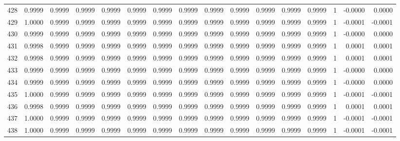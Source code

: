 \begin{tabular}{lrrrrrrrrrrrrrrr}
428 &      0.9999 &  0.9999 &  0.9999 &  0.9999 &  0.9999 &  0.9999 &  0.9999 &  0.9999 &  0.9999 &  0.9999 &   0.9999 &     0.9999 &      1 &                   -0.0000 &                     0.0000 \\
429 &      1.0000 &  0.9999 &  0.9999 &  0.9999 &  0.9999 &  0.9999 &  0.9999 &  0.9999 &  0.9999 &  0.9999 &   0.9999 &     0.9999 &      1 &                   -0.0001 &                    -0.0001 \\
430 &      0.9999 &  0.9999 &  0.9999 &  0.9999 &  0.9999 &  0.9999 &  0.9999 &  0.9999 &  0.9999 &  0.9999 &   0.9999 &     0.9999 &      1 &                   -0.0000 &                     0.0000 \\
431 &      0.9998 &  0.9999 &  0.9999 &  0.9999 &  0.9999 &  0.9999 &  0.9999 &  0.9999 &  0.9999 &  0.9999 &   0.9999 &     0.9999 &      1 &                    0.0001 &                     0.0001 \\
432 &      0.9998 &  0.9999 &  0.9999 &  0.9999 &  0.9999 &  0.9999 &  0.9999 &  0.9999 &  0.9999 &  0.9999 &   0.9999 &     0.9999 &      1 &                    0.0001 &                     0.0001 \\
433 &      0.9999 &  0.9999 &  0.9999 &  0.9999 &  0.9999 &  0.9999 &  0.9999 &  0.9999 &  0.9999 &  0.9999 &   0.9999 &     0.9999 &      1 &                   -0.0000 &                     0.0000 \\
434 &      0.9999 &  0.9999 &  0.9999 &  0.9999 &  0.9999 &  0.9999 &  0.9999 &  0.9999 &  0.9999 &  0.9999 &   0.9999 &     0.9999 &      1 &                   -0.0000 &                     0.0000 \\
435 &      1.0000 &  0.9999 &  0.9999 &  0.9999 &  0.9999 &  0.9999 &  0.9999 &  0.9999 &  0.9999 &  0.9999 &   0.9999 &     0.9999 &      1 &                   -0.0001 &                    -0.0001 \\
436 &      0.9998 &  0.9999 &  0.9999 &  0.9999 &  0.9999 &  0.9999 &  0.9999 &  0.9999 &  0.9999 &  0.9999 &   0.9999 &     0.9999 &      1 &                    0.0001 &                     0.0001 \\
437 &      1.0000 &  0.9999 &  0.9999 &  0.9999 &  0.9999 &  0.9999 &  0.9999 &  0.9999 &  0.9999 &  0.9999 &   0.9999 &     0.9999 &      1 &                   -0.0001 &                    -0.0001 \\
438 &      1.0000 &  0.9999 &  0.9999 &  0.9999 &  0.9999 &  0.9999 &  0.9999 &  0.9999 &  0.9999 &  0.9999 &   0.9999 &     0.9999 &      1 &                   -0.0001 &                    -0.0001 \\

\end{tabular}
